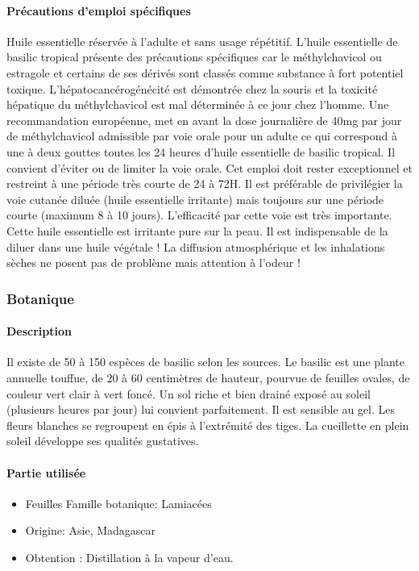 \documentclass[12pt,a4wide]{article}
\begin{document}
\paragraph{Précautions d'emploi spécifiques}
\label{sec-4-3-1-4}
Huile  essentielle  réservée  à  l'adulte  et  sans  usage  répétitif.   L'huile
essentielle  de basilic  tropical présente  des précautions  spécifiques car  le
méthylchavicol  ou estragole  et  certains  de ses  dérivés  sont classés  comme
substance à fort potentiel toxique.  L'hépatocancérogénécité est démontrée chez  la souris et
la  toxicité hépatique  du  méthylchavicol est  mal déterminée  à  ce jour  chez
l'homme.  Une  recommandation européenne,  met en avant  la dose  journalière de
40mg par jour de méthylchavicol admissible par  voie orale pour un adulte ce qui
correspond à  une à  deux gouttes  toutes les 24  heures d'huile  essentielle de
basilic tropical.  Il convient d'éviter ou  de limiter la voie orale. Cet emploi
doit rester exceptionnel et restreint à une période très courte de 24 à 72H.  Il
est  préférable  de  privilégier  la  voie  cutanée  diluée  (huile  essentielle
irritante)   mais  toujours   sur   une   période  courte   (maximum   8  à   10
jours).  L'efficacité  par   cette  voie  est  très   importante.   Cette  huile
essentielle est  irritante pure sur la  peau. Il est indispensable  de la diluer
dans une huile végétale !  La  diffusion atmosphérique et les inhalations sèches
ne  posent pas  de problème  mais attention  à l'odeur  ! 

\subsubsection{Botanique}
\label{sec-4-3-2}

\paragraph{Description}
\label{sec-4-3-2-1}
Il existe de 50  à 150 espèces de basilic selon les sources.  Le basilic est une
plante annuelle touffue, de 20 à  60 centimètres de hauteur, pourvue de feuilles
ovales, de couleur vert  clair à vert foncé. Un sol riche  et bien drainé exposé
au soleil (plusieurs heures par jour) lui convient parfaitement. Il est sensible
au gel. Les  fleurs blanches se regroupent  en épis à l'extrémité  des tiges. La
cueillette en plein soleil développe ses qualités gustatives.

\paragraph{Partie utilisée}
\label{sec-4-3-2-2}
\begin{itemize}
\item Feuilles Famille botanique: Lamiacées
\item Origine: Asie, Madagascar
\item Obtention : Distillation à la vapeur d'eau.
\end{itemize}
\end{document}

